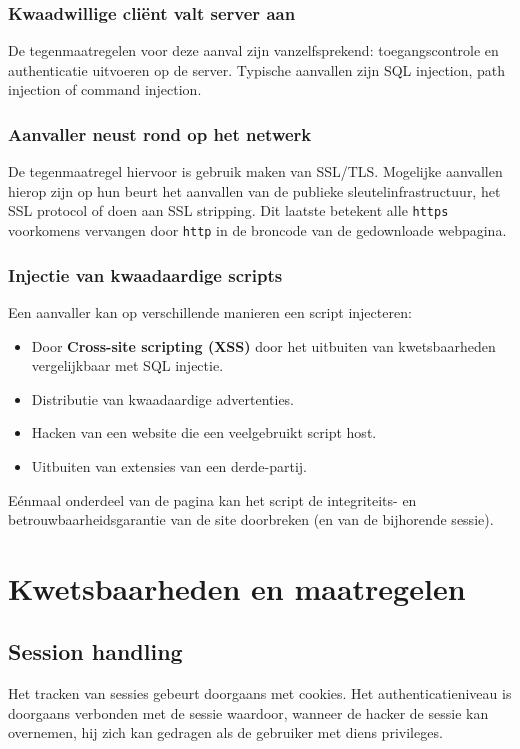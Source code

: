 \documentclass[../main.tex]{subfiles}
\begin{document}
\subsubsection{Kwaadwillige cli\"ent valt server aan}
De tegenmaatregelen voor deze aanval zijn vanzelfsprekend: toegangscontrole en authenticatie uitvoeren op de server. Typische aanvallen zijn SQL injection, path injection of command injection.

\subsubsection{Aanvaller neust rond op het netwerk}
De tegenmaatregel hiervoor is gebruik maken van SSL/TLS. Mogelijke aanvallen hierop zijn op hun beurt het aanvallen van de publieke sleutelinfrastructuur, het SSL protocol of doen aan SSL stripping. Dit laatste betekent alle \texttt{https} voorkomens vervangen door \texttt{http} in de broncode van de gedownloade webpagina.

\subsubsection{Injectie van kwaadaardige scripts}
Een aanvaller kan op verschillende manieren een script injecteren:
\begin{itemize}
	\item Door \textbf{Cross-site scripting (XSS)} door het uitbuiten van kwetsbaarheden vergelijkbaar met SQL injectie.
	\item Distributie van kwaadaardige advertenties.
	\item Hacken van een website die een veelgebruikt script host.
	\item Uitbuiten van extensies van een derde-partij.
\end{itemize}
E\'enmaal onderdeel van de pagina kan het script de integriteits- en betrouwbaarheidsgarantie van de site doorbreken (en van de bijhorende sessie).

\section{Kwetsbaarheden en maatregelen}

\subsection{Session handling}
Het tracken van sessies gebeurt doorgaans met cookies. Het authenticatieniveau is doorgaans verbonden met de sessie waardoor, wanneer de hacker de sessie kan overnemen, hij zich kan gedragen als de gebruiker met diens privileges.
\end{document}
